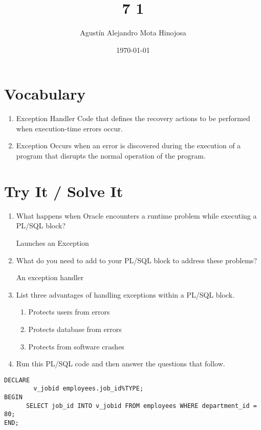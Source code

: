 \documentclass[11pt]{article}
\author{Agustín Alejandro Mota Hinojosa}
\date{\today}
\title{7 1}
\begin{document}
\maketitle
\tableofcontents

\section{Vocabulary}
\label{sec:org27628ed}

\begin{enumerate}
\item Exception Handler Code that defines the recovery actions to be performed when execution-time errors occur.
\item Exception Occurs when an error is discovered during the execution of a program that disrupts the normal operation of the program.
\end{enumerate}
\section{Try It / Solve It}
\label{sec:org2482a1e}

\begin{enumerate}
\item What happens when Oracle encounters a runtime problem while executing a PL/SQL block?

Launches an Exception

\item What do you need to add to your PL/SQL block to address these problems?

An exception handler

\item List three advantages of handling exceptions within a PL/SQL block.

\begin{enumerate}
\item Protects users from errors

\item Protects database from errors

\item Protects from software crashes
\end{enumerate}

\item Run this PL/SQL code and then answer the questions that follow.
\end{enumerate}
\begin{verbatim}
DECLARE
        v_jobid employees.job_id%TYPE;
BEGIN
      SELECT job_id INTO v_jobid FROM employees WHERE department_id = 80;
END;
\end{verbatim}
\end{document}
